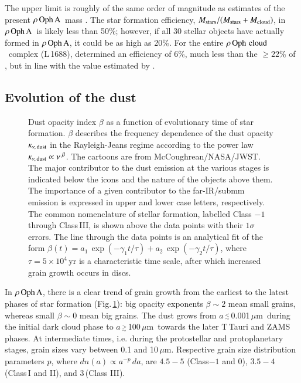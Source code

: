 \documentclass{aa}
\newcommand{\um}{$\mu$m}                                 %
\newcommand{\msun}{$M_{\odot}$}
\newcommand{\gapprox}{$\stackrel {>}{_{\sim}}$}   %
\newcommand{\lapprox}{$\stackrel {<}{_{\sim}}$}
\newcommand{\about}{$\sim$}                       %
\newcommand{\roc}{$\rho \, {\rm Oph \,\, cloud}$}
\newcommand{\roa}{$\rho \, {\rm Oph \, A}$}
\begin{document}
The upper limit is roughly of the same order of magnitude as estimates of the present \roa\ mass \citep[\about\,5 to 35\,\msun,][]{liseau2015}. The star formation efficiency, $M_{\rm stars} / (M_{\rm stars}+M_{\rm cloud})$, in \roa\ is likely less than 50\%; however,  if all  30 stellar objects have actually formed in \roa, it could be as high as  20\%. For the entire \roc\ complex (L\,1688), \citet{evans2009} determined an efficiency of 6\%, much less than the $\ge 22$\% of \citet{wilking1989}, but in line with the value estimated by \citet[][5-7\%]{liseau1995}.

\subsection{Evolution of the dust}

 \begin{figure*}
  \caption{Dust opacity index $\beta$ as a function of evolutionary time of star formation. $\beta$ describes the frequency dependence of the dust opacity $\kappa_{\nu,\,{\rm dust}}$ in the Rayleigh-Jeans regime according to the power law $\kappa_{\nu,\,{\rm dust}} \propto \nu^{\,\,\beta}$. The cartoons are from McCoughrean/NASA/JWST. The major contributor to the dust emission at the various stages is indicated below the icons and the nature of the objects above them. The importance of a given contributor to the far-IR/submm emission is expressed in upper  and lower case letters, respectively. The common nomenclature of stellar formation, labelled Class $-1$ through Class\,III,  is shown above the data points with their $1 \sigma$ errors. The line through the data points is an analytical fit  of the form $\beta(t) = a_1\,\exp(-\gamma_1  t/\tau) + a_2\,\exp(-\gamma_2 t/\tau)$, where $\tau = 5\times 10^4$\,yr is a characteristic time scale, after which increased grain growth occurs in discs. 
        }
  \label{beta_t}
\end{figure*}

In \roa, there is a clear trend of  grain growth from the earliest to the latest phases of star formation (Fig.\,\ref{beta_t}):  big opacity exponents $\beta \sim 2$ mean small grains, whereas small $\beta \sim 0$ mean big grains. The dust grows from $a$\,\lapprox\,0.001\,\um\ during the initial dark cloud phase to $a$\,\gapprox\,100\,\um\ towards the later T\,Tauri and ZAMS phases. At intermediate times, i.e. during the protostellar and protoplanetary stages, grain sizes vary between 0.1 and 10\,\um. Respective grain size distribution parameters $p$, where $dn(a) \propto a^{-p}\,da$, are $4.5-5$ (Class$-1$ and 0),  $3.5 - 4$  (Class\,I and II), and 3\,(Class III). 
\end{document}
